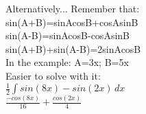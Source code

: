 \documentclass{article}
\begin{document}
\begin{enumerate}
\begin{enumerate}
        Alternatively... Remember that:\\
        sin(A+B)=sinAcosB+cosAsinB\\
        sin(A-B)=sinAcosB-cosAsinB\\
        sin(A+B)+sin(A-B)=2sinAcosB\\
        In the example: A=3x; B=5x\\
        Easier to solve with it:\\
        $\frac{1}{2}\int sin(8x)-sin(2x) \,dx$\\
        $\frac{-cos(8x)}{16}+\frac{cos(2x)}{4}$\\
    \end{enumerate}
\end{enumerate}
\end{document}
